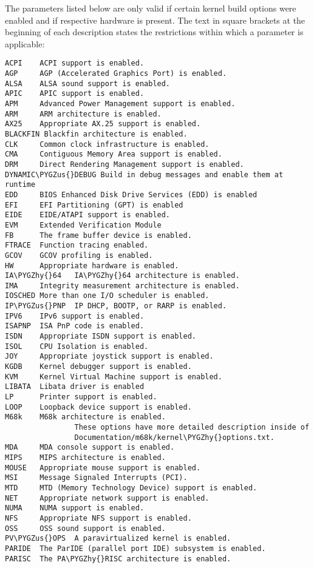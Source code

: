 \documentclass[a4paper,8pt,english]{sphinxmanual}
\def\PYGZus{\char`\_}
\def\PYGZhy{\char`\-}
\begin{document}
The parameters listed below are only valid if certain kernel build options were
enabled and if respective hardware is present. The text in square brackets at
the beginning of each description states the restrictions within which a
parameter is applicable:

\begin{Verbatim}[commandchars=\\\{\}]
ACPI    ACPI support is enabled.
AGP     AGP (Accelerated Graphics Port) is enabled.
ALSA    ALSA sound support is enabled.
APIC    APIC support is enabled.
APM     Advanced Power Management support is enabled.
ARM     ARM architecture is enabled.
AX25    Appropriate AX.25 support is enabled.
BLACKFIN Blackfin architecture is enabled.
CLK     Common clock infrastructure is enabled.
CMA     Contiguous Memory Area support is enabled.
DRM     Direct Rendering Management support is enabled.
DYNAMIC\PYGZus{}DEBUG Build in debug messages and enable them at runtime
EDD     BIOS Enhanced Disk Drive Services (EDD) is enabled
EFI     EFI Partitioning (GPT) is enabled
EIDE    EIDE/ATAPI support is enabled.
EVM     Extended Verification Module
FB      The frame buffer device is enabled.
FTRACE  Function tracing enabled.
GCOV    GCOV profiling is enabled.
HW      Appropriate hardware is enabled.
IA\PYGZhy{}64   IA\PYGZhy{}64 architecture is enabled.
IMA     Integrity measurement architecture is enabled.
IOSCHED More than one I/O scheduler is enabled.
IP\PYGZus{}PNP  IP DHCP, BOOTP, or RARP is enabled.
IPV6    IPv6 support is enabled.
ISAPNP  ISA PnP code is enabled.
ISDN    Appropriate ISDN support is enabled.
ISOL    CPU Isolation is enabled.
JOY     Appropriate joystick support is enabled.
KGDB    Kernel debugger support is enabled.
KVM     Kernel Virtual Machine support is enabled.
LIBATA  Libata driver is enabled
LP      Printer support is enabled.
LOOP    Loopback device support is enabled.
M68k    M68k architecture is enabled.
                These options have more detailed description inside of
                Documentation/m68k/kernel\PYGZhy{}options.txt.
MDA     MDA console support is enabled.
MIPS    MIPS architecture is enabled.
MOUSE   Appropriate mouse support is enabled.
MSI     Message Signaled Interrupts (PCI).
MTD     MTD (Memory Technology Device) support is enabled.
NET     Appropriate network support is enabled.
NUMA    NUMA support is enabled.
NFS     Appropriate NFS support is enabled.
OSS     OSS sound support is enabled.
PV\PYGZus{}OPS  A paravirtualized kernel is enabled.
PARIDE  The ParIDE (parallel port IDE) subsystem is enabled.
PARISC  The PA\PYGZhy{}RISC architecture is enabled.

\end{Verbatim}
\end{document}
